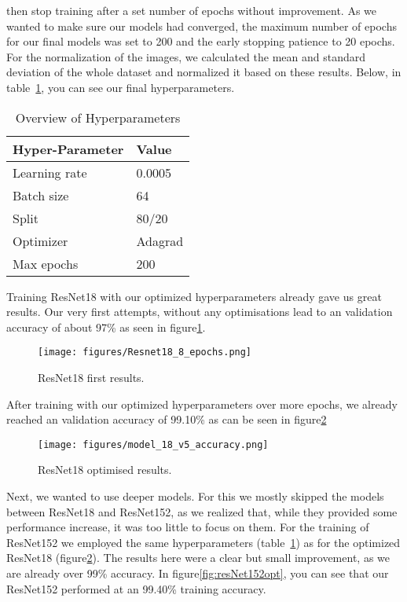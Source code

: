 then stop training after a set number of epochs without improvement. As we wanted to make sure our models had converged, the maximum number of epochs for our final models was set to 200 and the early stopping patience to 20 epochs. For the normalization of the images, we calculated the mean and standard deviation of the whole dataset and normalized it based on these results. Below, in table~\ref{tab:hyperparameters}, you can see our final hyperparameters. 

\begin{table}[h]
\centering
\begin{tabular}{ll}
\hline
\textbf{Hyper-Parameter} & \textbf{Value} \\
\hline
Learning rate & 0.0005 \\
Batch size & 64 \\
Split & 80/20 \\
Optimizer & Adagrad \\
Max epochs & 200 \\
\hline
\end{tabular}
\caption{Overview of Hyperparameters}
\label{tab:hyperparameters}
\end{table} 


\label{ResNet18}
Training ResNet18 with our optimized hyperparameters already gave us great results. Our very first attempts, without any optimisations lead to an validation accuracy of about 97\% as seen in figure\ref{fig:resNet18first}.
\begin{figure}[ht]
    \centering
    \texttt{[image: figures/Resnet18\_8\_epochs.png]}
    \caption{ResNet18 first results.}\label{fig:resNet18first}
\end{figure}

After training with our optimized hyperparameters over more epochs, we already reached an validation accuracy of 99.10\% as can be seen in figure\ref{fig:resNet18opt}

\begin{figure}[ht]
    \centering
    \texttt{[image: figures/model\_18\_v5\_accuracy.png]}
    \caption{ResNet18 optimised results.}\label{fig:resNet18opt}
\end{figure}

\label{ResNet152}
Next, we wanted to use deeper models. For this we mostly skipped the models between ResNet18 and ResNet152, as we realized that, while they provided some performance increase, it was too little to focus on them. For the training of ResNet152 we employed the same hyperparameters (table~\ref{tab:hyperparameters}) as for the optimized ResNet18 (figure\ref{fig:resNet18opt}). The results here were a clear but small improvement, as we are already over 99\% accuracy. In figure\ref{fig:resNet152opt}, you can see that our ResNet152 performed at an 99.40\% training accuracy. 

